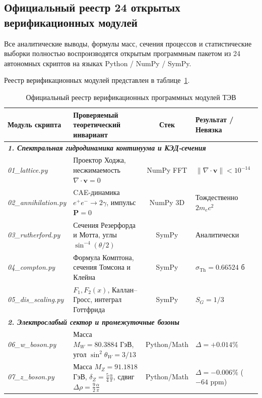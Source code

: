 \documentclass[11pt,a4paper]{article}
\theoremstyle{definition}
\theoremstyle{remark}
\begin{document}
\subsection{Официальный реестр 24 открытых верификационных модулей}
Все аналитические выводы, формулы масс, сечения процессов и статистические выборки полностью воспроизводятся открытым программным пакетом из 24 автономных скриптов на языках Python / NumPy / SymPy. 

Реестр верификационных модулей представлен в таблице~\ref{tab:script_registry_full}.

\begin{table}[H]
\centering
\small
\caption{Официальный реестр верификационных программных модулей ТЭВ}
\label{tab:script_registry_full}
\vspace{2mm}
\begin{tabularx}{\textwidth}{l p{5.5cm} c >{\raggedleft\arraybackslash}X}
\toprule
\textbf{Модуль скрипта} & \textbf{Проверяемый теоретический инвариант} & \textbf{Стек} & \textbf{Результат / Невязка} \\
\midrule
\multicolumn{4}{l}{\textit{\textbf{1. Спектральная гидродинамика континуума и КЭД-сечения}}} \\
\textit{01\_lattice.py} & Проектор Ходжа, несжимаемость $\nabla\cdot\mathbf{v} = 0$ & NumPy FFT & $\|\nabla\cdot\mathbf{v}\| < 10^{-14}$ \\
\textit{02\_annihilation.py} & CAE-динамика $e^+e^- \to 2\gamma$, импульс $\mathbf{P}=0$ & NumPy 3D & Тождественно $2 m_e c^2$ \\
\textit{03\_rutherford.py} & Сечения Резерфорда и Мотта, углы $\sin^{-4}(\theta/2)$ & SymPy & Аналитически \\
\textit{04\_compton.py} & Формула Комптона, сечения Томсона и Клейна & SymPy & $\sigma_{\mathrm{Th}} = 0.66524\text{ б}$ \\
\textit{05\_dis\_scaling.py} & $F_1, F_2(x)$, Каллан--Гросс, интеграл Готтфрида & SymPy & $S_G = 1/3$ \\
\midrule
\multicolumn{4}{l}{\textit{\textbf{2. Электрослабый сектор и промежуточные бозоны}}} \\
\textit{06\_w\_boson.py} & Масса $M_W = 80.3884$ ГэВ, угол $\sin^2\theta_W = 3/13$ & Python/Math & $\Delta = +0.014\%$ \\
\textit{07\_z\_boson.py} & Масса $M_Z = 91.1818$ ГэВ, $\delta_Z = \frac{5}{4}\frac{\alpha}{\pi}$, сдвиг $\Delta\rho = \frac{9}{2}\frac{\alpha}{\pi}$ & Python/Math & $\Delta = -0.006\%$ ($-64\text{ ppm}$) \\

\end{tabularx}
\end{table}
\end{document}
